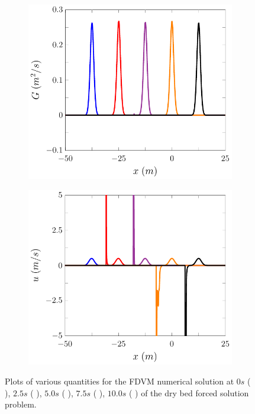\begin{figure}
\begin{subfigure}{0.5\textwidth}
		\vspace{0.5cm}
	\end{subfigure}
	\begin{subfigure}{0.5\textwidth}
		\includegraphics[width=\textwidth]{./chp5/figures/Forced/Dry/FDVMG.pdf}
		\vspace{0.5cm}
	\end{subfigure}%
	\begin{subfigure}{0.5\textwidth}
		\includegraphics[width=\textwidth]{./chp5/figures/Forced/Dry/FDVMu.pdf}
		\vspace{0.5cm}
	\end{subfigure}
	\caption{Plots of various quantities for the FDVM numerical solution at $0s$ ({\color{blue} \solidrule}), $2.5s$ ({\color{red} \solidrule}), $5.0s$ ({\color{violet!80!white} \solidrule}), $7.5s$ ({\color{orange} \solidrule}), $10.0s$ ({\color{black} \solidrule}) of the dry bed forced solution problem.}
	\label{fig:ForcedFDVMP2PExAll}
\end{figure}


